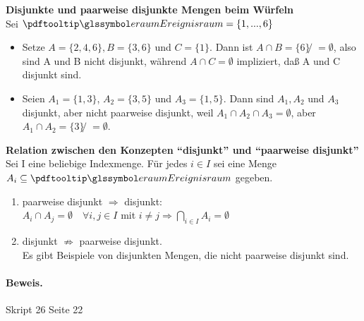 \begin{bsp} \textbf{Disjunkte und paarweise disjunkte Mengen beim Würfeln}  \\
    Sei $\eraum = \{1,...,6\}$
    \begin{itemize}
        \item Setze $A = \{2, 4, 6\}, B = \{3, 6\}$ und $C = \{1\}$. Dann ist $A \cap B = \{6\}̸ = \emptyset$, also sind A
        und B nicht disjunkt, während $ A \cap C = \emptyset$ impliziert, daß A und C disjunkt sind.
        \item Seien $A_1 = \{1,3\}$, $A_2 = \{3, 5\}$ und $A_3 = \{1, 5\}$. Dann sind $A_1, A_2$ und $A_3$ disjunkt,
        aber nicht paarweise disjunkt, weil $A_1 \cap A_2 \cap A_3 = \emptyset$, aber $A_1 \cap A_2 = \{3\}̸ = \emptyset$.
    \end{itemize}
\end{bsp}

\begin{lem}
    \textbf{Relation zwischen den Konzepten ``disjunkt'' und ``paarweise disjunkt''}
     \\
    Sei I eine beliebige Indexmenge.
    Für jedes $i \in I$ sei eine Menge $A_i \subseteq \eraum$ gegeben.
    \begin{enumerate}
        \item paarweise disjunkt $\Rightarrow$ disjunkt: \\ $A_i \cap A_j = \emptyset \quad \forall i,j \in I$ mit $i \neq j \Rightarrow \bigcap_{i \in I} A_i = \emptyset$
        \item disjunkt $\nRightarrow$ paarweise disjunkt. \\Es gibt Beispiele von disjunkten Mengen, die nicht
        paarweise disjunkt sind.
    \end{enumerate}
    \paragraph{Beweis.} Skript 26 Seite 22 %
\end{lem}

